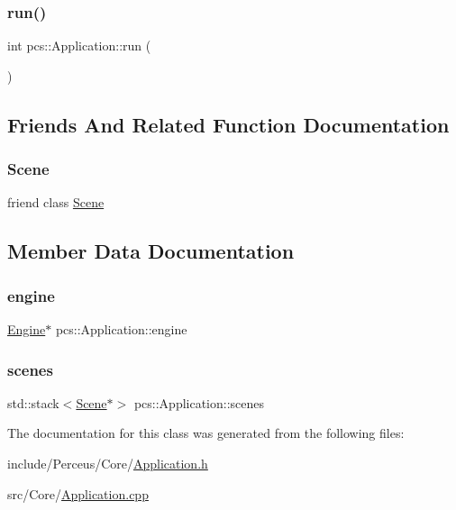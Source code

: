 \subsubsection{\texorpdfstring{run()}{run()}}
{\footnotesize\ttfamily int pcs\+::\+Application\+::run (\begin{DoxyParamCaption}{ }\end{DoxyParamCaption})}



\subsection{Friends And Related Function Documentation}
\mbox{\label{classpcs_1_1Application_a032858ae1fe02d2d1170981c2af2d67c}} 
\subsubsection{\texorpdfstring{Scene}{Scene}}
{\footnotesize\ttfamily friend class \hyperlink{classpcs_1_1Scene}{Scene}\hspace{0.3cm}{\ttfamily [friend]}}



\subsection{Member Data Documentation}
\mbox{\label{classpcs_1_1Application_a5d8a72ebc58019f9351926e04e079606}} 
\subsubsection{\texorpdfstring{engine}{engine}}
{\footnotesize\ttfamily \hyperlink{classpcs_1_1Engine}{Engine}$\ast$ pcs\+::\+Application\+::engine\hspace{0.3cm}{\ttfamily [private]}}

\mbox{\label{classpcs_1_1Application_afcc3279afd80bbe29841a54078401ce5}} 
\subsubsection{\texorpdfstring{scenes}{scenes}}
{\footnotesize\ttfamily std\+::stack$<$\hyperlink{classpcs_1_1Scene}{Scene}$\ast$$>$ pcs\+::\+Application\+::scenes\hspace{0.3cm}{\ttfamily [private]}}



The documentation for this class was generated from the following files\+:\begin{DoxyCompactItemize}
\item 
include/\+Perceus/\+Core/\hyperlink{Application_8h}{Application.\+h}\item 
src/\+Core/\hyperlink{Application_8cpp}{Application.\+cpp}\end{DoxyCompactItemize}
